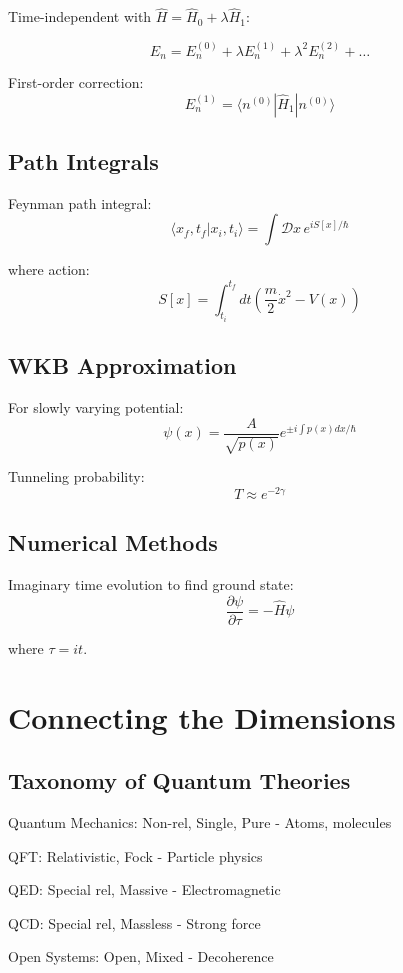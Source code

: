 \documentclass[12pt]{article}
\begin{document}
Time-independent with $\hat{H} = \hat{H}_0 + \lambda\hat{H}_1$:

\[
E_n = E_n^{(0)} + \lambda E_n^{(1)} + \lambda^2 E_n^{(2)} + \ldots
\]

First-order correction:
\[
E_n^{(1)} = \langle n^{(0)}|\hat{H}_1|n^{(0)}\rangle
\]

\subsection{Path Integrals}

Feynman path integral:
\[
\langle x_f, t_f|x_i, t_i\rangle = \int \mathcal{D}x \, e^{iS[x]/\hbar}
\]

where action:
\[
S[x] = \int_{t_i}^{t_f} dt \left(\frac{m}{2}\dot{x}^2 - V(x)\right)
\]

\subsection{WKB Approximation}

For slowly varying potential:
\[
\psi(x) = \frac{A}{\sqrt{p(x)}}e^{\pm i\int p(x)dx/\hbar}
\]

Tunneling probability:
\[
T \approx e^{-2\gamma}
\]

\subsection{Numerical Methods}

Imaginary time evolution to find ground state:
\[
\frac{\partial\psi}{\partial\tau} = -\hat{H}\psi
\]

where $\tau = it$.

\section{Connecting the Dimensions}

\subsection{Taxonomy of Quantum Theories}

Quantum Mechanics: Non-rel, Single, Pure - Atoms, molecules

QFT: Relativistic, Fock - Particle physics

QED: Special rel, Massive - Electromagnetic

QCD: Special rel, Massless - Strong force

Open Systems: Open, Mixed - Decoherence
\end{document}
